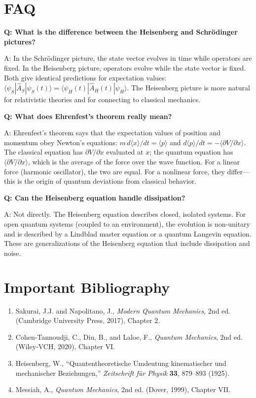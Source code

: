 \documentclass[11pt,openright]{book}
\begin{document}
\section*{FAQ}

\textbf{Q: What is the difference between the Heisenberg and Schr\"odinger pictures?}

A: In the Schr\"odinger picture, the state vector evolves in time while operators are fixed. In the Heisenberg picture, operators evolve while the state vector is fixed. Both give identical predictions for expectation values: $\langle\psi_S|\hat{A}_S|\psi_S(t)\rangle = \langle\psi_H(t)|\hat{A}_H(t)|\psi_H\rangle$. The Heisenberg picture is more natural for relativistic theories and for connecting to classical mechanics.

\textbf{Q: What does Ehrenfest's theorem really mean?}

A: Ehrenfest's theorem says that the expectation values of position and momentum obey Newton's equations: $m\,d\langle x\rangle/dt = \langle p\rangle$ and $d\langle p\rangle/dt = -\langle\partial V/\partial x\rangle$. The classical equation has $\partial V/\partial x$ evaluated at $x$; the quantum equation has $\langle\partial V/\partial x\rangle$, which is the average of the force over the wave function. For a linear force (harmonic oscillator), the two are equal. For a nonlinear force, they differ---this is the origin of quantum deviations from classical behavior.

\textbf{Q: Can the Heisenberg equation handle dissipation?}

A: Not directly. The Heisenberg equation describes closed, isolated systems. For open quantum systems (coupled to an environment), the evolution is non-unitary and is described by a Lindblad master equation or a quantum Langevin equation. These are generalizations of the Heisenberg equation that include dissipation and noise.
\section*{Important Bibliography}

\begin{enumerate}
\item Sakurai, J.J. and Napolitano, J., \textit{Modern Quantum Mechanics}, 2nd ed. (Cambridge University Press, 2017), Chapter 2.
\item Cohen-Tannoudji, C., Diu, B., and Laloe, F., \textit{Quantum Mechanics}, 2nd ed. (Wiley-VCH, 2020), Chapter VI.
\item Heisenberg, W., ``Quantentheoretische Umdeutung kinematischer und mechanischer Beziehungen,'' \textit{Zeitschrift f\"ur Physik} \textbf{33}, 879--893 (1925).
\item Messiah, A., \textit{Quantum Mechanics}, 2nd ed. (Dover, 1999), Chapter VII.
\end{enumerate}
\end{document}
